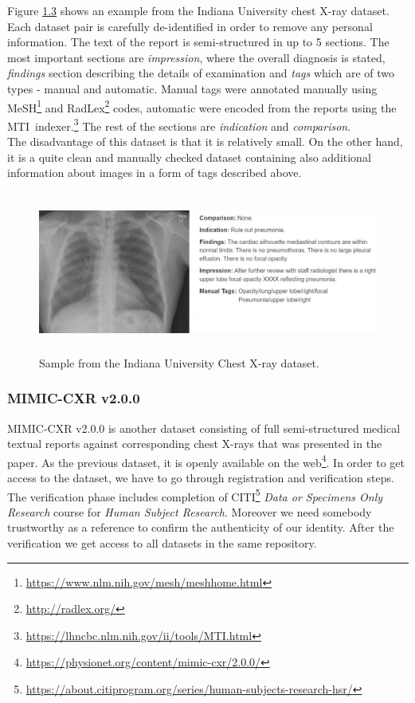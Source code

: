 Figure \hyperref[fig03:IUChestXRaySample]{1.3} shows an example from the Indiana University chest X-ray dataset. Each dataset pair is carefully de-identified in order to remove any personal information. The text of the report is semi-structured in up to 5 sections. The most important sections are \textit{impression}, where the overall diagnosis is stated, \textit{findings} section describing the details of examination and \textit{tags} which are of two types - manual and automatic. Manual tags were annotated manually using MeSH\footnote[4]{\url{https://www.nlm.nih.gov/mesh/meshhome.html}} and RadLex\footnote[5]{\url{http://radlex.org/}} codes, automatic were encoded from the reports using the MTI~indexer.\footnote[6]{\url{https://lhncbc.nlm.nih.gov/ii/tools/MTI.html}} The rest of the sections are \textit{indication} and \textit{comparison}.\\

The disadvantage of this dataset is that it is relatively small. On the other hand, it is a quite clean and manually checked dataset containing also additional information about images in a form of tags described above.

\begin{figure}[h]\centering
\includegraphics[width=145mm, height=53mm]{../img/IUChestXRaySample_CXR1728_IM-0479-1001}
\caption{Sample from the Indiana University Chest X-ray dataset.}
\label{fig03:IUChestXRaySample}
\end{figure}

\subsubsection{MIMIC-CXR v2.0.0}
MIMIC-CXR v2.0.0 is another dataset consisting of full semi-structured medical textual reports against corresponding chest X-rays that was presented in the \citet{cxr:johnson2019mimic} paper. As the previous dataset, it is openly available on the web\footnote[7]{\url{https://physionet.org/content/mimic-cxr/2.0.0/}}. In order to get access to the dataset, we have to go through registration and verification steps. The verification phase includes completion of CITI\footnote[8]{\url{https://about.citiprogram.org/series/human-subjects-research-hsr/}} \textit{Data or Specimens Only Research} course for \textit{Human Subject Research}. Moreover we need somebody trustworthy as a reference to confirm the authenticity of our identity. After the verification we get access to all datasets in the same repository.\\

